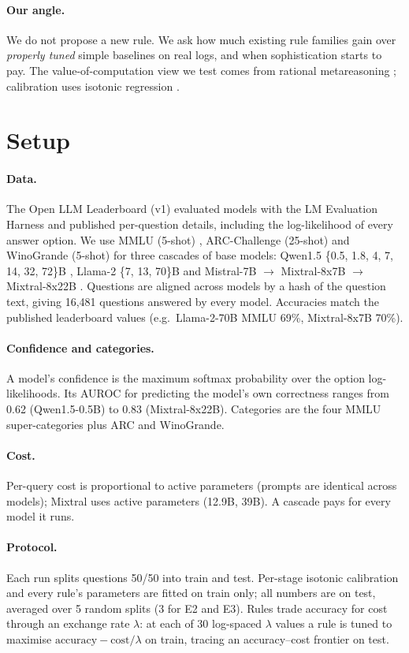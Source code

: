 \documentclass[10pt,twocolumn]{article}
\begin{document}
\paragraph{Our angle.} We do not propose a new rule. We ask how much existing rule families gain
over \emph{properly tuned} simple baselines on real logs, and when sophistication starts to pay.
The value-of-computation view we test comes from rational metareasoning \cite{russellwefald};
calibration uses isotonic regression \cite{guo2017}.

\section{Setup}\label{sec:setup}
\paragraph{Data.} The Open LLM Leaderboard (v1) \cite{openllmlb} evaluated models with the LM
Evaluation Harness \cite{lmeval} and published per-question details, including the log-likelihood of
every answer option. We use MMLU (5-shot) \cite{mmlu}, ARC-Challenge (25-shot) \cite{arc} and
WinoGrande (5-shot) \cite{winogrande} for three cascades of base models: Qwen1.5
\{0.5, 1.8, 4, 7, 14, 32, 72\}B \cite{qwen}, Llama-2 \{7, 13, 70\}B \cite{llama2} and Mistral-7B
$\to$ Mixtral-8x7B $\to$ Mixtral-8x22B \cite{mistral,mixtral}. Questions are aligned across models
by a hash of the question text, giving 16{,}481 questions answered by every model. Accuracies match the
published leaderboard values (e.g.\ Llama-2-70B MMLU 69\%, Mixtral-8x7B 70\%).
\paragraph{Confidence and categories.} A model's confidence is the maximum softmax probability over
the option log-likelihoods. Its AUROC for predicting the model's own correctness ranges from 0.62
(Qwen1.5-0.5B) to 0.83 (Mixtral-8x22B). Categories are the four MMLU super-categories plus ARC and
WinoGrande.
\paragraph{Cost.} Per-query cost is proportional to active parameters (prompts are identical across
models); Mixtral uses active parameters (12.9B, 39B). A cascade pays for every model it runs.
\paragraph{Protocol.} Each run splits questions 50/50 into train and test. Per-stage isotonic
calibration and every rule's parameters are fitted on train only; all numbers are on test, averaged
over 5 random splits (3 for E2 and E3). Rules trade accuracy for cost through an exchange rate
$\lambda$: at each of 30 log-spaced $\lambda$ values a rule is tuned to maximise
$\text{accuracy} - \text{cost}/\lambda$ on train, tracing an accuracy--cost frontier on test.
\end{document}
